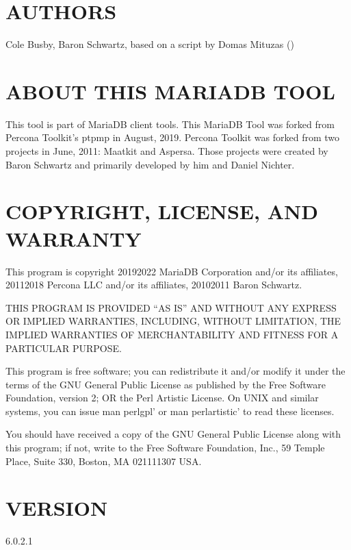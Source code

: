 \documentclass[letterpaper,10pt,english]{sphinxmanual}
\begin{document}
\section{AUTHORS}
\label{\detokenize{mariadb-stacktrace:authors}}
Cole Busby, Baron Schwartz, based on a script by Domas Mituzas ()


\section{ABOUT THIS MARIADB TOOL}
\label{\detokenize{mariadb-stacktrace:about-this-mariadb-tool}}
This tool is part of MariaDB client tools. This MariaDB Tool was forked from
Percona Toolkit’s pt\sphinxhyphen{}pmp in August, 2019. Percona Toolkit was forked from two
projects in June, 2011: Maatkit and Aspersa.  Those projects were created by
Baron Schwartz and primarily developed by him and Daniel Nichter.


\section{COPYRIGHT, LICENSE, AND WARRANTY}
\label{\detokenize{mariadb-stacktrace:copyright-license-and-warranty}}
This program is copyright 2019\sphinxhyphen{}2022 MariaDB Corporation and/or its affiliates,
2011\sphinxhyphen{}2018 Percona LLC and/or its affiliates, 2010\sphinxhyphen{}2011 Baron Schwartz.

THIS PROGRAM IS PROVIDED “AS IS” AND WITHOUT ANY EXPRESS OR IMPLIED
WARRANTIES, INCLUDING, WITHOUT LIMITATION, THE IMPLIED WARRANTIES OF
MERCHANTABILITY AND FITNESS FOR A PARTICULAR PURPOSE.

This program is free software; you can redistribute it and/or modify it under
the terms of the GNU General Public License as published by the Free Software
Foundation, version 2; OR the Perl Artistic License.  On UNIX and similar
systems, you can issue \textasciigrave{}man perlgpl’ or \textasciigrave{}man perlartistic’ to read these
licenses.

You should have received a copy of the GNU General Public License along with
this program; if not, write to the Free Software Foundation, Inc., 59 Temple
Place, Suite 330, Boston, MA  02111\sphinxhyphen{}1307  USA.


\section{VERSION}
\label{\detokenize{mariadb-stacktrace:version}}
 6.0.2.1
\end{document}
